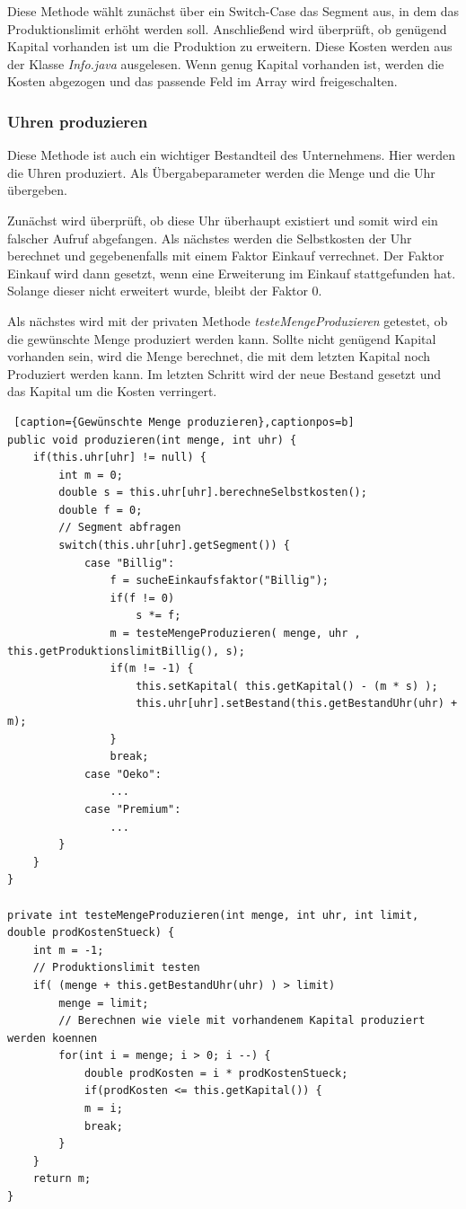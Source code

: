 Diese Methode wählt zunächst über ein Switch-Case das Segment aus, in dem das Produktionslimit erhöht werden soll. Anschließend wird überprüft, ob genügend Kapital vorhanden ist um die Produktion zu erweitern. Diese Kosten werden aus der Klasse \textit{Info.java} ausgelesen. Wenn genug Kapital vorhanden ist, werden die Kosten abgezogen und das passende Feld im Array wird freigeschalten.

\subsubsection{Uhren produzieren}
Diese Methode ist auch ein wichtiger Bestandteil des Unternehmens. Hier werden die Uhren produziert. Als Übergabeparameter werden die Menge und die Uhr übergeben. 

Zunächst wird überprüft, ob diese Uhr überhaupt existiert und somit wird ein falscher Aufruf abgefangen. Als nächstes werden die Selbstkosten der Uhr berechnet und gegebenenfalls mit einem Faktor Einkauf verrechnet. Der Faktor Einkauf wird dann gesetzt, wenn eine Erweiterung im Einkauf stattgefunden hat. Solange dieser nicht erweitert wurde, bleibt der Faktor 0.

Als nächstes wird mit der privaten Methode \textit{testeMengeProduzieren} getestet, ob die gewünschte Menge produziert werden kann. Sollte nicht genügend Kapital vorhanden sein, wird die Menge berechnet, die mit dem letzten Kapital noch Produziert werden kann. Im letzten Schritt wird der neue Bestand gesetzt und das Kapital um die Kosten verringert.

\lstset{language=Java} 
\begin{lstlisting} [caption={Gewünschte Menge produzieren},captionpos=b]
public void produzieren(int menge, int uhr) {
	if(this.uhr[uhr] != null) {
		int m = 0;
		double s = this.uhr[uhr].berechneSelbstkosten();
		double f = 0;
		// Segment abfragen
		switch(this.uhr[uhr].getSegment()) {
			case "Billig":
				f = sucheEinkaufsfaktor("Billig");
				if(f != 0)
					s *= f;
				m = testeMengeProduzieren( menge, uhr , this.getProduktionslimitBillig(), s);
				if(m != -1) {
					this.setKapital( this.getKapital() - (m * s) );
					this.uhr[uhr].setBestand(this.getBestandUhr(uhr) + m);
				}
				break;
			case "Oeko":
				...
			case "Premium":
				...
		}
	}
}

private int testeMengeProduzieren(int menge, int uhr, int limit, double prodKostenStueck) {
	int m = -1;
	// Produktionslimit testen
	if( (menge + this.getBestandUhr(uhr) ) > limit)
		menge = limit;
		// Berechnen wie viele mit vorhandenem Kapital produziert werden koennen
		for(int i = menge; i > 0; i --) {
			double prodKosten = i * prodKostenStueck;
			if(prodKosten <= this.getKapital()) {
			m = i;
			break;
		}
	}
	return m;
}
\end{lstlisting}

